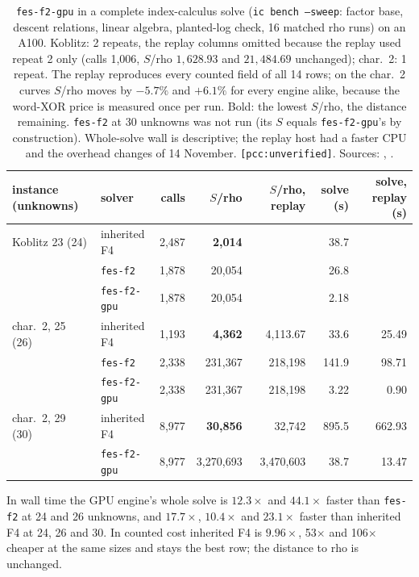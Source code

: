 \begin{table}[t]
\centering\small
\setlength{\tabcolsep}{4pt}
\begin{tabular}{@{}llrrrrr@{}}
\toprule
instance (unknowns) & solver & calls & $S$/rho & $S$/rho, replay & solve (s) & solve, replay (s) \\
\midrule
Koblitz 23 (24) & inherited F4 & 2{,}487 & \textbf{2{,}014} & & 38.7 & \\
 & \texttt{fes-f2} & 1{,}878 & 20{,}054 & & 26.8 & \\
 & \texttt{fes-f2-gpu} & 1{,}878 & 20{,}054 & & 2.18 & \\
char.~2, 25 (26) & inherited F4 & 1{,}193 & \textbf{4{,}362} & 4{,}113.67 & 33.6 & 25.49 \\
 & \texttt{fes-f2} & 2{,}338 & 231{,}367 & 218{,}198 & 141.9 & 98.71 \\
 & \texttt{fes-f2-gpu} & 2{,}338 & 231{,}367 & 218{,}198 & 3.22 & 0.90 \\
char.~2, 29 (30) & inherited F4 & 8{,}977 & \textbf{30{,}856} & 32{,}742 & 895.5 & 662.93 \\
 & \texttt{fes-f2-gpu} & 8{,}977 & 3{,}270{,}693 & 3{,}470{,}603 & 38.7 & 13.47 \\
\bottomrule
\end{tabular}
\caption[]{\texttt{fes-f2-gpu} in a complete index-calculus solve
(\texttt{ic bench --sweep}: factor base, descent relations, linear algebra,
planted-log check, 16 matched rho runs) on an A100. Koblitz: 2 repeats, the
replay columns omitted because the replay used repeat 2 only (calls 1{,}006,
$S$/rho $1{,}628.93$ and $21{,}484.69$ unchanged); char.~2: 1 repeat. The
replay reproduces every counted field of all 14 rows; on the char.~2
curves $S$/rho moves by $-5.7\%$ and $+6.1\%$ for every engine alike,
because the word-XOR price is measured once per run. Bold: the lowest
$S$/rho, the distance remaining. \texttt{fes-f2} at 30 unknowns was not run
(its $S$ equals \texttt{fes-f2-gpu}'s by construction). Whole-solve wall is
descriptive; the replay host had a faster CPU and the overhead changes of
14 November. \texttt{[pcc:unverified]}. Sources:
,
.}
\label{tab:in-gpu-e2e}
\end{table}

\noindent In wall time the GPU engine's whole solve is $12.3\times$ and
$44.1\times$ faster than \texttt{fes-f2} at 24 and 26 unknowns, and
$17.7\times$, $10.4\times$ and $23.1\times$ faster than inherited F4 at 24, 26
and 30. In counted cost inherited F4 is $9.96\times$, 53$\times$ and
106$\times$ cheaper at the same sizes and stays the best row; the distance
to rho is unchanged.

